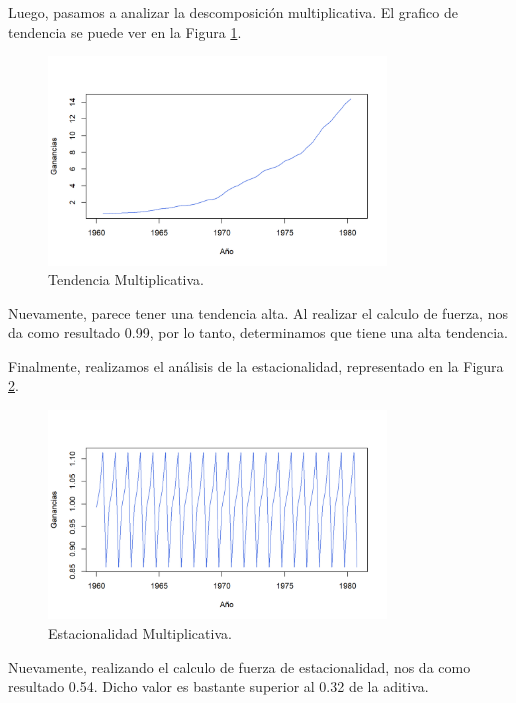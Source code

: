 \documentclass{article} %
\begin{document}
Luego, pasamos a analizar la descomposición multiplicativa. El grafico de tendencia se puede ver en la Figura \ref{fig:TendenciaMultiplicativa}.

\begin{figure}[H]
	\centering
	\includegraphics[width=0.8\textwidth]{images/4-4 Tendencia Multiplicativa}
	\caption{Tendencia Multiplicativa.}
	\label{fig:TendenciaMultiplicativa}
\end{figure} 

Nuevamente, parece tener una tendencia alta. Al realizar el calculo de fuerza, nos da como resultado 0.99, por lo tanto, determinamos que tiene una alta tendencia.

Finalmente, realizamos el análisis de la estacionalidad, representado en la Figura \ref{fig:EstacionalidadMultiplicativa}.

\begin{figure}[H]
	\centering
	\includegraphics[width=0.8\textwidth]{images/4-5 Estacionalidad Multiplicativa}
	\caption{Estacionalidad Multiplicativa.}
	\label{fig:EstacionalidadMultiplicativa}
\end{figure} 

Nuevamente, realizando el calculo de fuerza de estacionalidad, nos da como resultado 0.54. Dicho valor es bastante superior al 0.32 de la aditiva. 
\end{document}
